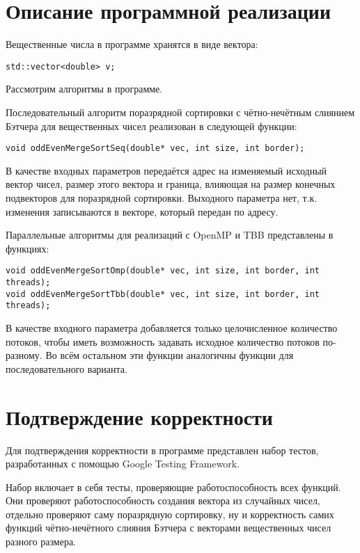 \documentclass{report}
\begin{document}
\section*{Описание программной реализации}
Вещественные числа в программе хранятся в виде вектора:
\begin{lstlisting}
std::vector<double> v;
\end{lstlisting}
Рассмотрим алгоритмы в программе.
\par Последовательный алгоритм поразрядной сортировки с чётно-нечётным слиянием Бэтчера для вещественных чисел реализован в следующей функции:
\begin{lstlisting}
void oddEvenMergeSortSeq(double* vec, int size, int border);
\end{lstlisting}
\par В качестве входных параметров передаётся адрес на изменяемый исходный вектор чисел, размер этого вектора и граница, влияющая на размер конечных подвекторов для поразрядной сортировки. Выходного параметра нет, т.к. изменения записываются в векторе, который передан по адресу.
\par Параллельные алгоритмы для реализаций с OpenMP и TBB представлены в функциях:
\begin{lstlisting}
void oddEvenMergeSortOmp(double* vec, int size, int border, int threads);
void oddEvenMergeSortTbb(double* vec, int size, int border, int threads);
\end{lstlisting}
\par В качестве входного параметра добавляется только целочисленное количество потоков, чтобы иметь возможность задавать исходное количество потоков по-разному. Во всём остальном эти функции аналогичны функции для последовательного варианта.

\newpage

\section*{Подтверждение корректности}
Для подтверждения корректности в программе представлен набор тестов, разработанных с помощью Google Testing Framework.
\par Набор включает в себя тесты, проверяющие работоспособность всех функций. Они проверяют работоспособность создания вектора из случайных чисел, отдельно проверяют саму поразрядную сортировку, ну и корректность самих функций чётно-нечётного слияния Бэтчера с векторами вещественных чисел разного размера.
\end{document}

